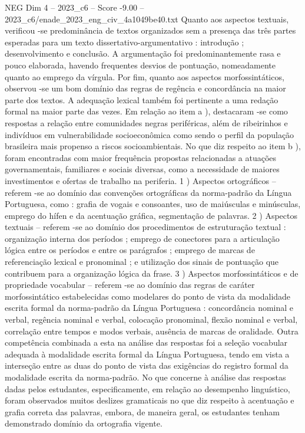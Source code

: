 \begin{textsample}{NEG Dim 4 – 2023\_c6 – Score -9.00 – 2023\_c6/enade\_2023\_eng\_civ\_4a1049be40.txt}
Quanto aos aspectos textuais, verificou -se predominância de textos organizados sem a presença das três partes esperadas para um texto dissertativo-argumentativo : introdução ; desenvolvimento e conclusão.
A argumentação foi predominantemente rasa e pouco elaborada, havendo frequentes desvios de pontuação, nomeadamente quanto ao emprego da vírgula.
Por fim, quanto aos aspectos morfossintáticos, observou -se um bom domínio das regras de regência e concordância na maior parte dos textos.
A adequação lexical também foi pertinente a uma redação formal na maior parte das vezes.
Em relação ao item a ), destacaram -se como respostas a relação entre comunidades negras periféricas, além de ribeirinhos e indivíduos em vulnerabilidade socioeconômica como sendo o perfil da população brasileira mais propenso a riscos socioambientais.
No que diz respeito ao item b ), foram encontradas com maior frequência propostas relacionadas a atuações governamentais, familiares e sociais diversas, como a necessidade de maiores investimentos e ofertas de trabalho na periferia. 1 ) Aspectos ortográficos – referem -se ao domínio das convenções ortográficas da norma-padrão da Língua Portuguesa, como : grafia de vogais e consoantes, uso de maiúsculas e minúsculas, emprego do hífen e da acentuação gráfica, segmentação de palavras. 2 ) Aspectos textuais – referem -se ao domínio dos procedimentos de estruturação textual : organização interna dos períodos ; emprego de conectores para a articulação lógica entre os períodos e entre os parágrafos ; emprego de marcas de referenciação lexical e pronominal ; e utilização dos sinais de pontuação que contribuem para a organização lógica da frase. 3 ) Aspectos morfossintáticos e de propriedade vocabular – referem -se ao domínio das regras de caráter morfossintático estabelecidas como modelares do ponto de vista da modalidade escrita formal da norma-padrão da Língua Portuguesa : concordância nominal e verbal, regência nominal e verbal, colocação pronominal, flexão nominal e verbal, correlação entre tempos e modos verbais, ausência de marcas de oralidade.
Outra competência combinada a esta na análise das respostas foi a seleção vocabular adequada à modalidade escrita formal da Língua Portuguesa, tendo em vista a interseção entre as duas do ponto de vista das exigências do registro formal da modalidade escrita da norma-padrão.
No que concerne à análise das respostas dadas pelos estudantes, especificamente, em relação ao desempenho linguístico, foram observados muitos deslizes gramaticais no que diz respeito à acentuação e grafia correta das palavras, embora, de maneira geral, os estudantes tenham demonstrado domínio da ortografia vigente.

\end{textsample}
